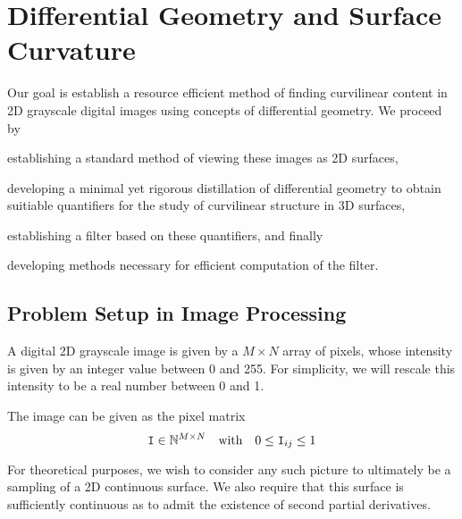 \chapter{Differential Geometry and Surface Curvature} \label{ch:diffgeo}


Our goal is establish a resource efficient method of finding curvilinear content in 2D grayscale digital images using concepts of differential geometry. We proceed by
\begin{enumerate*}[label=(\roman*)]
	\item establishing a standard method of viewing these images as 2D surfaces,
	\item developing a minimal yet rigorous distillation of differential geometry
			to obtain suitiable quantifiers
			for the study of curvilinear structure in 3D surfaces,
	\item establishing a filter based on these quantifiers,
	and finally
	\item developing methods necessary for efficient computation of the filter.
\end{enumerate*}


\section{Problem Setup in Image Processing}\label{sec:image-processing-setup}

A digital 2D grayscale image is given by a $M\times N$ array of pixels, whose intensity is given by an integer value between 0 and 255. For simplicity, we will rescale this intensity to be a real number between 0 and 1.

\begin{defn} The image can be given as the pixel matrix \label{def:image_as_pixel_matrix}
	\begin{equation*}
	\mathtt{I} \in \mathbb{N}^{M \times N}
	\quad\textrm{with}\quad
	0 \le \mathtt{I}_{ij} \le 1
	\end{equation*}
\end{defn}
	For theoretical purposes, we wish to consider any such picture to ultimately be a sampling of a 2D continuous surface. We also require that this surface is sufficiently continuous as to admit the existence of second partial derivatives.
	
